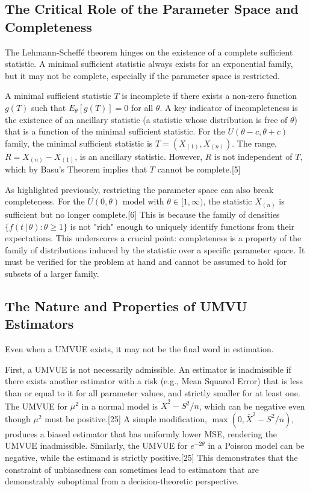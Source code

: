 \documentclass[11pt, letterpaper]{article}
\newcommand{\given}{\,|\,}
\begin{document}
\subsection*{The Critical Role of the Parameter Space and Completeness}
The Lehmann-Scheffé theorem hinges on the existence of a complete sufficient statistic. A minimal sufficient statistic always exists for an exponential family, but it may not be complete, especially if the parameter space is restricted.

A minimal sufficient statistic $T$ is incomplete if there exists a non-zero function $g(T)$ such that $E_\theta[g(T)] = 0$ for all $\theta$. A key indicator of incompleteness is the existence of an ancillary statistic (a statistic whose distribution is free of $\theta$) that is a function of the minimal sufficient statistic. For the $U(\theta-c, \theta+c)$ family, the minimal sufficient statistic is $T=(X_{(1)}, X_{(n)})$. The range, $R=X_{(n)}-X_{(1)}$, is an ancillary statistic. However, $R$ is not independent of $T$, which by Basu's Theorem implies that $T$ cannot be complete.[5]

As highlighted previously, restricting the parameter space can also break completeness. For the $U(0,\theta)$ model with $\theta \in [1, \infty)$, the statistic $X_{(n)}$ is sufficient but no longer complete.[6] This is because the family of densities $\{f(t \given \theta): \theta \ge 1\}$ is not "rich" enough to uniquely identify functions from their expectations. This underscores a crucial point: completeness is a property of the family of distributions induced by the statistic over a specific parameter space. It must be verified for the problem at hand and cannot be assumed to hold for subsets of a larger family.

\subsection*{The Nature and Properties of UMVU Estimators}
Even when a UMVUE exists, it may not be the final word in estimation.

First, a UMVUE is not necessarily admissible. An estimator is inadmissible if there exists another estimator with a risk (e.g., Mean Squared Error) that is less than or equal to it for all parameter values, and strictly smaller for at least one. The UMVUE for $\mu^2$ in a normal model is $\bar{X}^2 - S^2/n$, which can be negative even though $\mu^2$ must be positive.[25] A simple modification, $\max(0, \bar{X}^2 - S^2/n)$, produces a biased estimator that has uniformly lower MSE, rendering the UMVUE inadmissible. Similarly, the UMVUE for $e^{-2\theta}$ in a Poisson model can be negative, while the estimand is strictly positive.[25] This demonstrates that the constraint of unbiasedness can sometimes lead to estimators that are demonstrably suboptimal from a decision-theoretic perspective.
\end{document}
